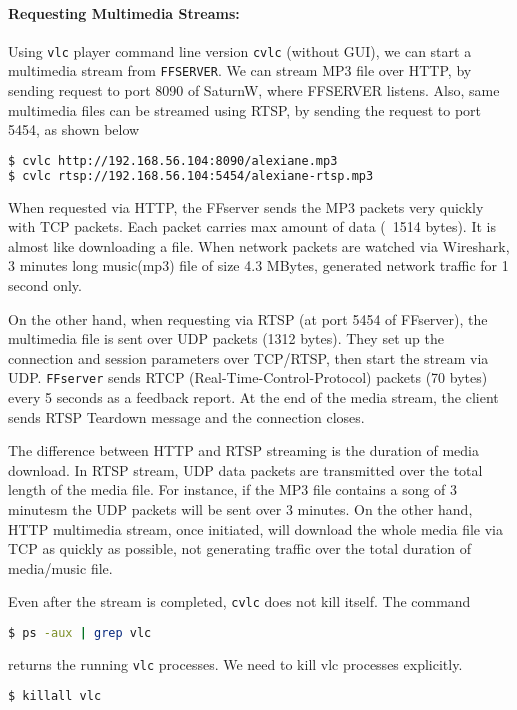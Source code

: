 \documentclass[a4paper]{article}
\begin{document}
\paragraph{Requesting Multimedia Streams:}
Using \texttt{vlc} player command line version \texttt{cvlc} (without GUI), we can start a multimedia stream from \texttt{FFSERVER}.
We can stream MP3 file over HTTP, by sending request to port 8090 of SaturnW, where FFSERVER listens.
Also, same multimedia files can be streamed using RTSP, by sending the request to port 5454, as shown below

\begin{lstlisting}[language=bash, numbers=none]
$ cvlc http://192.168.56.104:8090/alexiane.mp3
$ cvlc rtsp://192.168.56.104:5454/alexiane-rtsp.mp3
\end{lstlisting}

When requested via HTTP, the FFserver sends the MP3 packets very quickly with TCP packets. 
Each packet carries max amount of data (~1514 bytes). It is almost like downloading a file. 
When network packets are watched via Wireshark, 3 minutes long music(mp3) file of size 4.3 MBytes, generated network traffic for 1 second only.

On the other hand, when requesting via RTSP (at port 5454 of FFserver), the multimedia file is sent over UDP packets (1312 bytes).
They set up the connection and session parameters over TCP/RTSP, then start the stream via UDP.
\texttt{FFserver} sends RTCP (Real-Time-Control-Protocol) packets (70 bytes) every 5 seconds as a feedback report.
At the end of the media stream, the client sends RTSP Teardown message and the connection closes.


The difference between HTTP and RTSP streaming is the duration of media download.
In RTSP stream, UDP data packets are transmitted over the total length of the media file. For instance, if the MP3 file contains a song of 3 minutesm the UDP packets will be sent over 3 minutes.
On the other hand, HTTP multimedia stream, once initiated, will download the whole media file via TCP as quickly as possible, 
not generating traffic over the total duration of media/music file.

Even after the stream is completed, \texttt{cvlc} does not kill itself. The command
\begin{lstlisting}[language=bash, numbers=none]
$ ps -aux | grep vlc
\end{lstlisting}

returns the running \texttt{vlc} processes. We need to kill vlc processes explicitly.
\begin{lstlisting}[language=bash, numbers=none]
$ killall vlc
\end{lstlisting}
\end{document}
